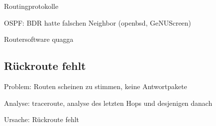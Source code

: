 \begin{notes}
\item Routingprotokolle
\item OSPF: BDR hatte falschen Neighbor (openbsd, GeNUScreen)
\item Routersoftware quagga
\end{notes}

\subsection{Rückroute fehlt}
\label{sec:rueckroute-fehlt}

\begin{notes}
\item Problem: Routen scheinen zu stimmen, keine Antwortpakete
\item Analyse: traceroute, analyse des letzten Hops und desjenigen danach
\item Ursache: Rückroute fehlt
\end{notes}




